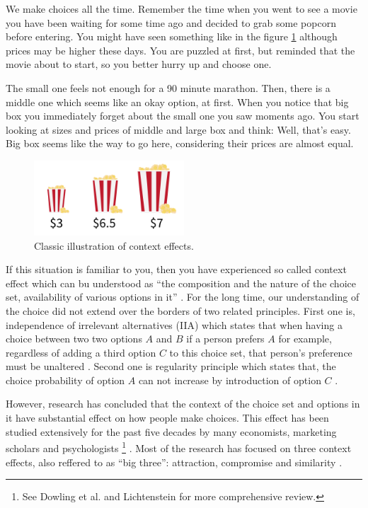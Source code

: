 \documentclass[a4paper,12pt]{article}
\newcommand{\citeyearonly}[1]{\citeyearpar{#1}}
\begin{document}
We make choices all the time. Remember the time when you went to see a movie you have been waiting for some time ago and decided to grab some popcorn before entering. You might have seen something like in the figure \ref{fig:decoyPopcornExample}  although prices may be higher these days. You are puzzled at first, but reminded that the movie about to start, so you better hurry up and choose one. 

The small one feels not enough for a 90 minute marathon. Then, there is a middle one which seems like an okay option,  at first. When you notice that big box you immediately forget about the small one you saw moments ago. You start looking at sizes and prices of middle and large box and think: Well, that's easy. Big box seems like the way to go here, considering their prices are almost equal. 


\begin{figure}[H]
    \centering
    \includegraphics[width=0.5\textwidth]{staticFiles/popcornDecoy.png}
    \caption{Classic illustration of context effects.}
    \label{fig:decoyPopcornExample}
\end{figure}

If this situation is familiar to you, then you have experienced so called context effect which can bu understood as ``the composition  and the nature of the choice set, availability of various options in it'' \citep{tversky1972elimination, huberPuto83}. For the long time, our understanding of the choice did not extend over the borders of two related principles. First one is, independence of irrelevant alternatives (IIA) which states that when having a choice between two two options $A$ and $B$ if a person prefers $A$ for example, regardless of adding a third option $C$ to this choice set, that person's preference must be unaltered \citep{luce59}. Second one is regularity principle which states that, the choice probability of option $A$ can not increase by introduction of option $C$ \citep{luce59}.

However, research has concluded that the context of the choice set and options in it have substantial effect on how people make choices. This effect has been studied extensively for the past five decades by many economists, marketing scholars and psychologists \footnote{See Dowling et al. \citeyearonly{dowlingEtAl20} and Lichtenstein \citeyearonly{lichtenstein2006construction} for more comprehensive review.} \citep{ kahnemanTversky79, simonson89, tverskySimonson93, lichtenstein2006construction, dowlingEtAl20}. Most of the research has focused on three context effects, also reffered to as ``big three'': attraction, compromise and similarity \citep{howes2016contextual}.
\end{document}
